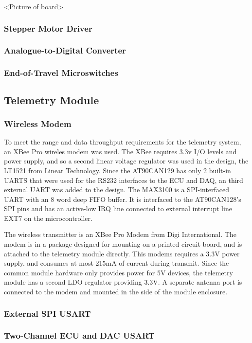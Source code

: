 <Picture of board>


\subsubsection{Stepper Motor Driver}


\subsubsection{Analogue-to-Digital Converter}


\subsubsection{End-of-Travel Microswitches}


\subsection{Telemetry Module}


\subsubsection{Wireless Modem}

To meet the range and data throughput requirements for the telemetry system, an XBee Pro wireles modem was used. The XBee requires 3.3v I/O levels and power supply, and so a second linear voltage regulator was used in the design, the LT1521 from Linear Technology. Since the AT90CAN129 has only 2 built-in UARTS that were used for the RS232 interfaces to the ECU and DAQ, an third external UART was added to the design. The MAX3100 is a SPI-interfaced UART with an 8 word deep FIFO buffer. It is interfaced to the AT90CAN128's SPI pins and has an active-low IRQ line connected to external interrupt line EXT7 on the microcontroller. 

The wireless transmitter is an XBee Pro Modem from Digi International. The modem is in a package designed for mounting on a printed circuit board, and is attached to the telemetry module directly. This modems requires a 3.3V power supply. and consumes at most 215mA of current during transmit. Since the common module hardware only provides power for 5V devices, the telemetry module has a second LDO regulator providing 3.3V. A separate antenna port is connected to the modem and mounted in the side of the module enclosure.



\subsubsection{External SPI USART}


\subsubsection{Two-Channel ECU and DAC USART}



